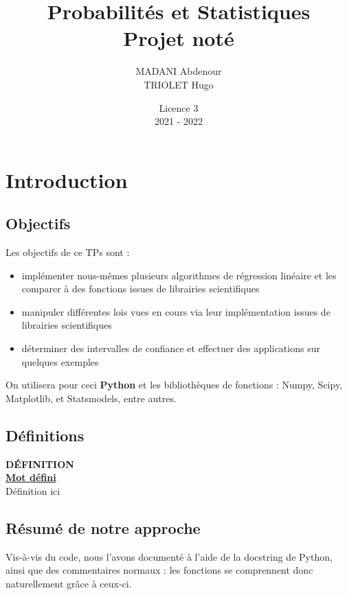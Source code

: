 \documentclass{article}      %
\title{Probabilités et Statistiques\\\Large{Projet noté}}
\author{MADANI Abdenour\\TRIOLET Hugo}
\date{Licence 3\\2021 - 2022}
\begin{document}
\normalsize
\maketitle

\renewcommand*\contentsname{Table des matières}
\tableofcontents
\newpage



\section{Introduction}
\subsection{Objectifs}
Les objectifs de ce TPs sont :
\begin{itemize}
  \item implémenter nous-mêmes plusieurs algorithmes de régression linéaire et les comparer à des fonctions issues de librairies scientifiques
  \item manipuler différentes lois vues en cours via leur implémentation issues de librairies scientifiques
  \item déterminer des intervalles de confiance et effectuer des applications sur quelques exemples
\end{itemize}

On utilisera pour ceci \textbf{Python} et les bibliothèques de fonctions : Numpy, Scipy, Matplotlib, et Statsmodels, entre autres.



\subsection{Définitions}
\begin{definition}
{ \scriptsize \textcolor{definition}{ \textbf{DÉFINITION}}}
\vspace{3px}
\\ \underline{\textbf{Mot défini}}
\vspace{2.5px}
\\ Définition ici
\end{definition}


\subsection{Résumé de notre approche}
Vis-à-vis du code, nous l’avons documenté à l’aide de la docstring de Python, ainsi que des commentaires normaux : les fonctions se comprennent donc naturellement grâce à ceux-ci.
\end{document}
